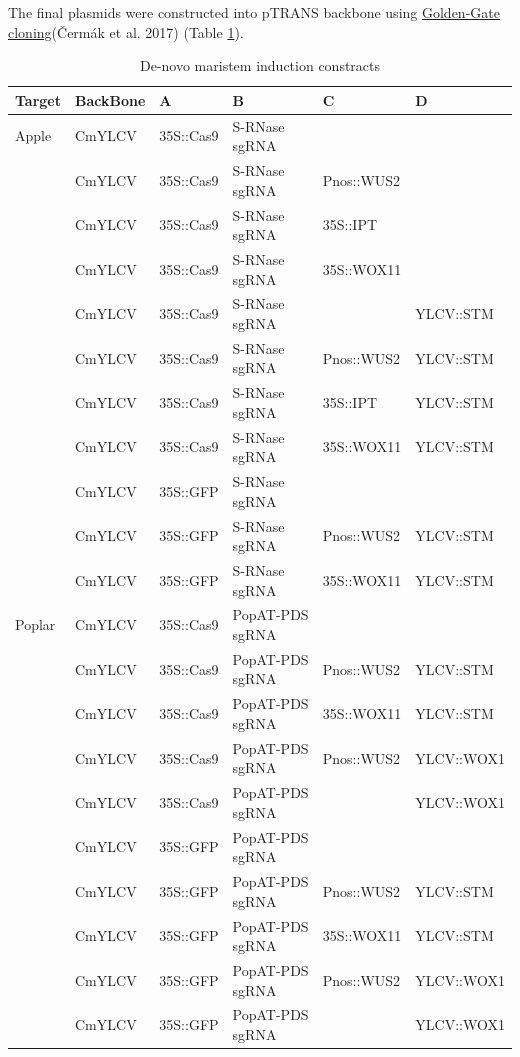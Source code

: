 \documentclass[
]{article}
\begin{document}
The final plasmids were constructed into pTRANS backbone using
\href{https://blog.addgene.org/plasmids-101-golden-gate-cloning}{Golden-Gate
cloning}(Čermák et al. 2017) (Table \ref{tab:AllConstracts}).

\begin{table}[H]

\caption{\label{tab:AllConstracts}De-novo maristem induction constracts}
\centering
\begin{tabular}[t]{llllll}
\toprule
Target & BackBone & A & B & C & D\\
\midrule
Apple & CmYLCV & 35S::Cas9 & S-RNase sgRNA &  & \\
 & CmYLCV & 35S::Cas9 & S-RNase sgRNA & Pnos::WUS2 & \\
 & CmYLCV & 35S::Cas9 & S-RNase sgRNA & 35S::IPT & \\
 & CmYLCV & 35S::Cas9 & S-RNase sgRNA & 35S::WOX11 & \\
 & CmYLCV & 35S::Cas9 & S-RNase sgRNA &  & YLCV::STM\\
 & CmYLCV & 35S::Cas9 & S-RNase sgRNA & Pnos::WUS2 & YLCV::STM\\
 & CmYLCV & 35S::Cas9 & S-RNase sgRNA & 35S::IPT & YLCV::STM\\
 & CmYLCV & 35S::Cas9 & S-RNase sgRNA & 35S::WOX11 & YLCV::STM\\
 & CmYLCV & 35S::GFP & S-RNase sgRNA &  & \\
 & CmYLCV & 35S::GFP & S-RNase sgRNA & Pnos::WUS2 & YLCV::STM\\
 & CmYLCV & 35S::GFP & S-RNase sgRNA & 35S::WOX11 & YLCV::STM\\
\addlinespace
Poplar & CmYLCV & 35S::Cas9 & PopAT-PDS sgRNA &  & \\
 & CmYLCV & 35S::Cas9 & PopAT-PDS sgRNA & Pnos::WUS2 & YLCV::STM\\
 & CmYLCV & 35S::Cas9 & PopAT-PDS sgRNA & 35S::WOX11 & YLCV::STM\\
 & CmYLCV & 35S::Cas9 & PopAT-PDS sgRNA & Pnos::WUS2 & YLCV::WOX1\\
 & CmYLCV & 35S::Cas9 & PopAT-PDS sgRNA &  & YLCV::WOX1\\
 & CmYLCV & 35S::GFP & PopAT-PDS sgRNA &  & \\
 & CmYLCV & 35S::GFP & PopAT-PDS sgRNA & Pnos::WUS2 & YLCV::STM\\
 & CmYLCV & 35S::GFP & PopAT-PDS sgRNA & 35S::WOX11 & YLCV::STM\\
 & CmYLCV & 35S::GFP & PopAT-PDS sgRNA & Pnos::WUS2 & YLCV::WOX1\\
 & CmYLCV & 35S::GFP & PopAT-PDS sgRNA &  & YLCV::WOX1\\
\bottomrule
\end{tabular}
\end{table}
\end{document}
